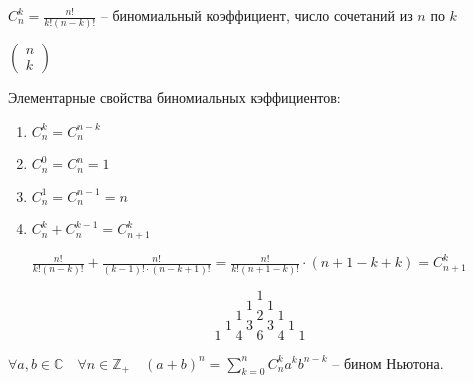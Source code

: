 \documentclass{book}
\newcommand\Z{\ensuremath{\mathbb{Z}}}
\renewcommand\C{\ensuremath{\mathbb{C}}}
\theoremstyle{definition}
\begin{document}
    \begin{definition}

        $C_n^k = \frac{n!}{k!(n-k)!}$ -- биномиальный коэффициент, число сочетаний из $n$ по $k$

        $\begin{pmatrix} n\\k \end{pmatrix} $
    \end{definition}
    Элементарные свойства биномиальных кэффициентов:
       \begin{enumerate}
           \item $C_n^k = C_n^{n-k}$
           \item $C_n^0 = C_n^n = 1$
           \item $C_n^1 = C_n^{n-1} = n$
           \item $C_n^k + C_n^{k-1} = C_{n+1}^k$

               $\frac{n!}{k!(n-k)!} + \frac{n!}{(k-1)!\cdot (n-k+1)!} = \frac{n!}{k!(n+1-k)!} \cdot  (n+1-k+k) = C_{n+1}^k$ 
       \end{enumerate}

       $$1$$ $$1\quad 1$$ $$1\quad 2\quad 1$$ $$1\quad 3\quad 3\quad 1$$ $$1\quad 4\quad 6\quad 4\quad 1$$

       \begin{statement}
           $\forall a, b\in \C\quad \forall n\in \Z _+\quad (a+b)^n = \sum_{k=0}^{n} C_n^ka^kb^{n-k}$ -- бином Ньютона.
       \end{statement}
\end{document}
